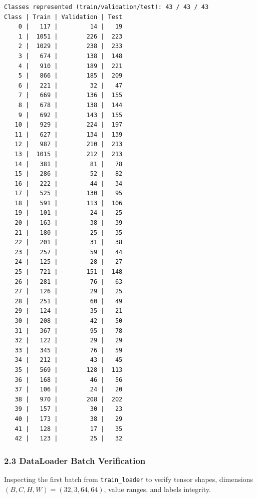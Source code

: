 \documentclass[11pt]{article}
\begin{document}
    \begin{Verbatim}[commandchars=\\\{\}]
Classes represented (train/validation/test): 43 / 43 / 43
Class | Train | Validation | Test
    0 |   117 |         14 |   19
    1 |  1051 |        226 |  223
    2 |  1029 |        238 |  233
    3 |   674 |        138 |  148
    4 |   910 |        189 |  221
    5 |   866 |        185 |  209
    6 |   221 |         32 |   47
    7 |   669 |        136 |  155
    8 |   678 |        138 |  144
    9 |   692 |        143 |  155
   10 |   929 |        224 |  197
   11 |   627 |        134 |  139
   12 |   987 |        210 |  213
   13 |  1015 |        212 |  213
   14 |   381 |         81 |   78
   15 |   286 |         52 |   82
   16 |   222 |         44 |   34
   17 |   525 |        130 |   95
   18 |   591 |        113 |  106
   19 |   101 |         24 |   25
   20 |   163 |         38 |   39
   21 |   180 |         25 |   35
   22 |   201 |         31 |   38
   23 |   257 |         59 |   44
   24 |   125 |         28 |   27
   25 |   721 |        151 |  148
   26 |   281 |         76 |   63
   27 |   126 |         29 |   25
   28 |   251 |         60 |   49
   29 |   124 |         35 |   21
   30 |   208 |         42 |   50
   31 |   367 |         95 |   78
   32 |   122 |         29 |   29
   33 |   345 |         76 |   59
   34 |   212 |         43 |   45
   35 |   569 |        128 |  113
   36 |   168 |         46 |   56
   37 |   106 |         24 |   20
   38 |   970 |        208 |  202
   39 |   157 |         30 |   23
   40 |   173 |         38 |   29
   41 |   128 |         17 |   35
   42 |   123 |         25 |   32
    \end{Verbatim}

    \subsubsection{2.3 DataLoader Batch
Verification}\label{dataloader-batch-verification}

Inspecting the first batch from \texttt{train\_loader} to verify tensor
shapes, dimensions \((B, C, H, W) = (32, 3, 64, 64)\), value ranges, and
labels integrity.
\end{document}
